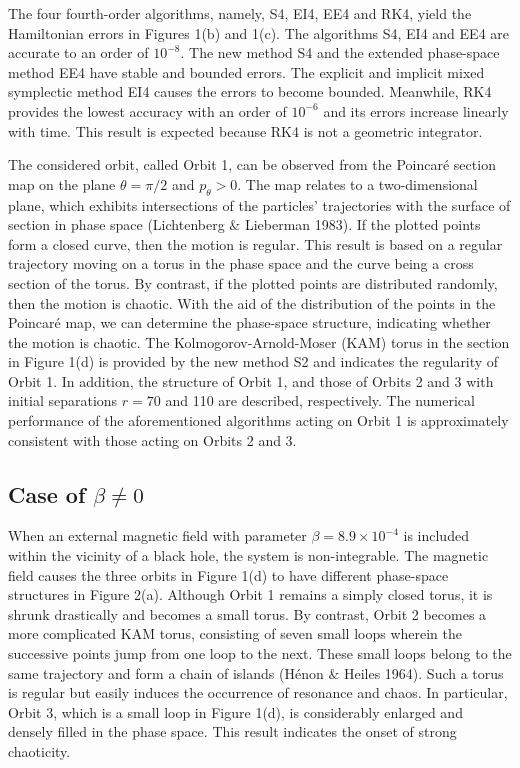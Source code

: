 \documentclass[preprint2]{aastex}
\begin{document}
The four fourth-order algorithms, namely,  S4, EI4, EE4 and RK4,
yield the Hamiltonian errors in Figures 1(b) and 1(c). The
algorithms S4, EI4 and EE4 are accurate to an order of $10^{-8}$.
The new method S4 and the extended phase-space method EE4 have
stable and bounded errors. The explicit and implicit mixed
symplectic method EI4 causes the errors to become bounded.
Meanwhile, RK4 provides the lowest accuracy with an order of
$10^{-6}$ and its errors increase linearly with time. This result
is expected because RK4 is not a geometric integrator.

The considered orbit, called Orbit 1, can be observed from the
Poincar\'{e} section map on the plane $\theta=\pi/2$ and
$p_{\theta}>0$. The map relates to a two-dimensional plane, which
exhibits intersections of the particles' trajectories with the
surface of section in phase space (Lichtenberg $\&$ Lieberman
1983). If the plotted points form a closed curve, then the motion
is regular. This result is based on  a regular trajectory moving
on a torus in the phase space and the curve being a cross section
of the torus. By contrast, if the plotted points are distributed
randomly, then the motion is chaotic. With the aid of the
distribution of the points in the Poincar\'{e} map, we can
determine the phase-space structure, indicating whether the motion
is chaotic. The Kolmogorov-Arnold-Moser (KAM) torus in the section
in Figure 1(d) is provided by the new method S2 and indicates the
regularity of Orbit 1. In addition, the structure of Orbit 1, and
those of Orbits 2 and 3 with initial separations $r=70$ and 110
are described, respectively. The numerical performance of the
aforementioned algorithms acting on Orbit 1 is approximately
consistent with those acting on Orbits 2 and 3.

\subsection{Case of $\beta\neq 0$}

When an external magnetic field with parameter $\beta=8.9\times
10^{-4}$ is included within the vicinity of a black hole, the
system is non-integrable. The magnetic field causes the three
orbits in Figure 1(d) to have different phase-space structures in
Figure 2(a). Although Orbit 1 remains a simply closed torus, it is
shrunk drastically and becomes a small torus. By contrast, Orbit 2
becomes a more complicated KAM torus, consisting of seven small
loops wherein the successive points jump from one loop to the
next. These small loops  belong  to the same trajectory and form a
chain of islands (H\'{e}non $\&$ Heiles 1964). Such a torus is
regular but easily induces the occurrence of resonance and chaos.
In particular, Orbit 3, which is a small loop in Figure 1(d), is
considerably enlarged and densely filled in the phase space. This
result indicates the onset of strong chaoticity.
\end{document}
